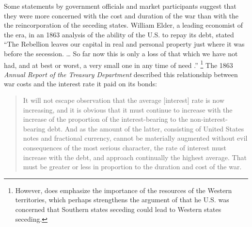 Some statements by government officials and market participants suggest that they were more concerned with the cost and duration of the war than with the the reincorporation of the seceding states.
William Elder, a leading economist of the era, in an 1863 analysis of the ability of the U.S. to repay its debt, stated ``The Rebellion leaves our capital in real and personal property just where it was before the secession. \dots{} So far now this is only a loss of that which we have not had, and at best or worst, a very small one in any time of need \parencite[19]{Elder1863}.''%
\footnote{
  However, \textcite{Elder1863} does emphasize the importance of the resources of the Western territories, which perhaps strengthens the argument of  \textcite{Weingast1998} that he U.S. was concerned that Southern states seceding could lead to Western states seceding.
}
The 1863 \textit{Annual Report of the Treasury Department} described this relationship between war costs and the interest rate it paid on its bonds:
\begin{quote}
It will not escape observation that the average [interest] rate is now increasing, and it is obvious that it must continue to increase with the increase of the proportion of the interest-bearing to the non-interest-bearing debt.
And as the amount of the latter, consisting of United States notes and fractional currency, cannot be materially augmented without evil consequences of the most serious character, the rate of interest must increase with the debt, and approach continually the highest average.
That must be greater or less in proportion to the duration and cost of the war. \parencite[13]{Treasury1863}
\end{quote}

